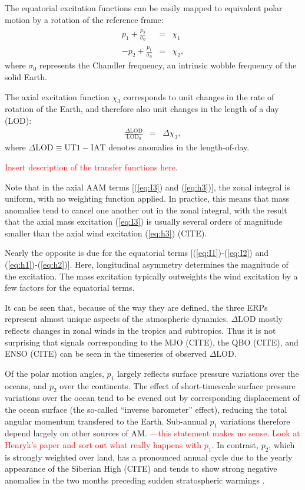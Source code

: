 \documentclass[draft,jgrga]{agutex}
\begin{document}
\begin{article}
The equatorial excitation functions can be easily mapped to equivalent polar motion by a rotation of the reference frame:
\begin{eqnarray}
  p_1 + \frac{\dot{p_2}}{\sigma_0} &=& \chi_1 \\
  -p_2 + \frac{\dot{p_1}}{\sigma_0} &=& \chi_2,
\label{eq:X12_to_PM}
\end{eqnarray}
where $\sigma_0$ represents the Chandler frequency, an intrinsic wobble frequency of the solid Earth.

The axial excitation function $\chi_3$ corresponds to unit changes in the rate of rotation of the Earth, and therefore also unit changes in the length of a day (LOD):
\begin{eqnarray}
\frac{\Delta \text{LOD}}{ \text{LOD}_0 } &=& \Delta \chi_3,
\end{eqnarray}
where $\Delta \text{LOD}  \equiv \text{UT1} - \text{IAT}$ denotes anomalies in the length-of-day.

\textcolor{red}{Insert description of the transfer functions here.}

Note that in the axial AAM terms [(\ref{eq:I3}) and (\ref{eq:h3})], the zonal integral is uniform, with no weighting function applied.
In practice, this means that mass anomalies tend to cancel one another out in the zonal integral, with the result that the axial mass excitation (\ref{eq:I3}) is usually several orders of magnitude smaller than the axial wind excitation (\ref{eq:h3}) (CITE).

Nearly the opposite is due for the equatorial terms [(\ref{eq:I1})-(\ref{eq:I2}) and (\ref{eq:h1})-(\ref{eq:h2})].
Here, longitudinal asymmetry determines the magnitude of the excitation.
The mass excitation typically outweights the wind excitation by a few factors for the equatorial terms.

It can be seen that, because of the way they are defined, the three ERPs represent almost unique aspects of the atmospheric dynamics.
$\Delta$LOD mostly reflects changes in zonal winds in the tropics and subtropics.
Thus it is not surprising that signals corresponding to the MJO (CITE), the QBO (CITE), and ENSO (CITE) can be seen in the timeseries of observed $\Delta$LOD.

Of the polar motion angles, $p_1$ largely reflects surface pressure variations over the oceans, and $p_2$ over the continents.
The effect of short-timescale surface pressure variations over the ocean tend to be evened out by corresponding displacement of the ocean surface (the so-called ``inverse barometer'' effect), reducing the total angular momentum transfered to the Earth.  
Sub-annual $p_1$ variations therefore depend largely on other sources of AM.
\textcolor{red}{---this statement makes no sense.  Look at Henryk's paper and sort out what really happens with $p_1$}.
In contrast, $p_2$, which is strongly weighted over land, has a pronounced annual cycle due to the yearly appearance of the Siberian High (CITE) and tends to show strong negative anomalies in the two months preceding sudden stratospheric warmings \citep{neefmatthes2013sub}.



\end{article}
\end{document}
